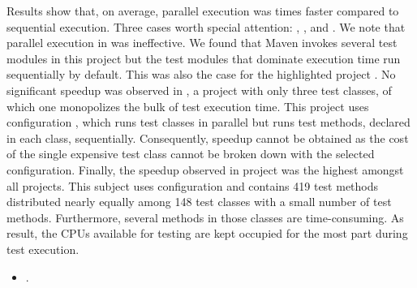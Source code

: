 Results show that, on average, parallel execution was
\avgSpeedup{} times faster compared to sequential execution.
Three cases worth special attention: , ,
and .
We note that parallel execution in  was
ineffective.  We found that Maven invokes several test modules in this
project but the test modules that dominate execution time run
sequentially by default. This was also the case for the highlighted
project .
No significant speedup was observed in , a project with
only three test classes, of which one monopolizes the bulk of test
execution time.
This project uses configuration \ParClassSeqMeth{}, which runs test
classes in parallel but runs test methods, declared in each class,
sequentially.
Consequently, speedup cannot be obtained as the cost of the single
expensive test class cannot be broken down with the selected
configuration.
Finally, the speedup observed in project  was
the highest amongst all projects. This subject uses configuration
\ParClassParMeth{} and contains 419 test methods distributed nearly
equally among 148 test classes with a small number of test methods.
Furthermore, several methods in those classes are time-consuming.
As result, the CPUs available for testing are kept occupied for the
most part during test execution.

\begin{center}
\vspace{1ex}
\vspace{1ex}
\end{center}

\begin{itemize}
    \item \numRQSpeedupTwo{}. \textbf{\RQSpeedupTwo}
\end{itemize}

